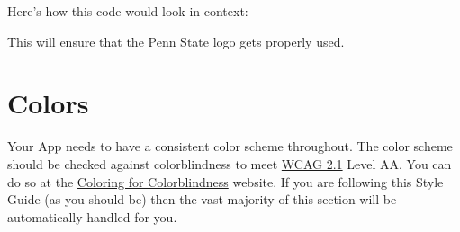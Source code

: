 \documentclass[
]{book}
\newenvironment{Shaded}{\begin{snugshade}}{\end{snugshade}}
\newcommand{\CommentTok}[1]{\textcolor[rgb]{0.56,0.35,0.01}{\textit{#1}}}
\newcommand{\DataTypeTok}[1]{\textcolor[rgb]{0.13,0.29,0.53}{#1}}
\newcommand{\DecValTok}[1]{\textcolor[rgb]{0.00,0.00,0.81}{#1}}
\newcommand{\KeywordTok}[1]{\textcolor[rgb]{0.13,0.29,0.53}{\textbf{#1}}}
\newcommand{\NormalTok}[1]{#1}
\newcommand{\OperatorTok}[1]{\textcolor[rgb]{0.81,0.36,0.00}{\textbf{#1}}}
\newcommand{\StringTok}[1]{\textcolor[rgb]{0.31,0.60,0.02}{#1}}
\begin{document}
\begin{Shaded}
\end{Shaded}

Here's how this code would look in context:

\begin{Shaded}
\end{Shaded}

This will ensure that the Penn State logo gets properly used.

\hypertarget{colors}{%
\section{Colors}\label{colors}}

Your App needs to have a consistent color scheme throughout. The color scheme should be checked against colorblindness to meet \href{https://www.w3.org/WAI/WCAG21/quickref/}{WCAG 2.1} Level AA. You can do so at the \href{https://davidmathlogic.com/colorblind/\#\%23000000-\%23E69F00-\%2356B4E9-\%23009E73-\%23F0E442-\%230072B2-\%23D55E00-\%23CC79A7}{Coloring for Colorblindness} website. If you are following this Style Guide (as you should be) then the vast majority of this section will be automatically handled for you.
\end{document}
